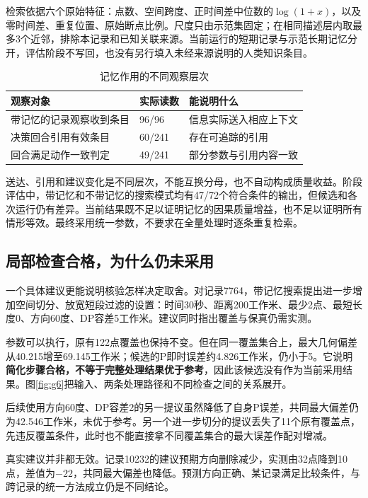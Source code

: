 检索依据六个原始特征：点数、空间跨度、正时间差中位数的$\log(1+x)$，以及零时间差、重复位置、原始断点比例。尺度只由示范集固定；在相同描述层内取最多3个近邻，排除本记录和已知关联来源。当前运行的短期记录与示范长期记忆分开，评估阶段不写回，也没有另行填入未经来源说明的人类知识条目。

\begin{table}[htbp]\centering\small
\caption{记忆作用的不同观察层次}\label{tab:memory}
\begin{tabularx}{\linewidth}{@{}L{42mm}L{27mm}Y@{}}\toprule
观察对象 & 实际读数 & 能说明什么\\\midrule
带记忆的记录观察收到条目 & 96/96 & 信息实际送入相应上下文\\
决策回合引用有效条目 & 60/241 & 存在可追踪的引用\\
回合满足动作一致判定 & 49/241 & 部分参数与引用内容一致\\\bottomrule
\end{tabularx}
\end{table}

送达、引用和建议变化是不同层次，不能互换分母，也不自动构成质量收益。阶段评估中，带记忆和不带记忆的搜索模式均有47/72个符合条件的输出，但候选和各次运行仍有差异。当前结果既不足以证明记忆的因果质量增益，也不足以证明所有情形等效。最终采用统一参数，不要求在全量处理时逐条重复检索。

\subsection{局部检查合格，为什么仍未采用}
一个具体建议更能说明核验怎样决定取舍。对记录7764，带记忆搜索提出进一步增加空间切分、放宽短段过滤的设置：时间30秒、距离200工作米、最少2点、最短长度0、方向60度、DP容差5工作米。建议同时指出覆盖与保真仍需实测。

参数可以执行，原有122点覆盖也保持不变。但在同一覆盖集合上，最大几何偏差从40.215增至69.145工作米；候选的P即时误差约4.826工作米，仍小于5。它说明\textbf{简化步骤合格，不等于完整处理结果优于参考}，因此该候选没有作为当前采用结果。图\ref{fig:g6}把输入、两条处理路径和不同检查之间的关系展开。

后续使用方向60度、DP容差2的另一提议虽然降低了自身P误差，共同最大偏差仍为42.546工作米，未优于参考。另一个进一步切分的提议丢失了11个原有覆盖点，先违反覆盖条件，此时也不能直接拿不同覆盖集合的最大误差作配对增减。

真实建议并非都无效。记录10232的建议预期方向删除减少，实测由32点降到10点，差值为$-22$，共同最大偏差也降低。预测方向正确、某记录满足比较条件，与跨记录的统一方法成立仍是不同结论。

